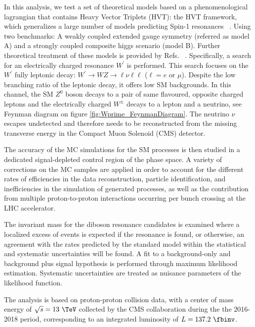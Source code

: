 In this analysis, we test a set of theoretical models based on a phenomenological
lagrangian that contains Heavy Vector Triplets (HVT): the HVT framework, which
generalizes a large number of models predicting Spin-1 resonances ~\cite{hvt2014}.
Using two benchmarks: A weakly coupled extended gauge symmetry (referred as model A) and a
strongly coupled composite higgs scenario (model B). Further theoretical treatment of these models
is provided by Refs. ~\cite{hvt2014,modelA1980,modelB2011}. Specifically, a search
for an electrically charged resonance $W^{\prime}$ is performed. This search focuses
on the $W^{\prime}$ fully leptonic decay:
$W^{\prime}\rightarrow WZ \rightarrow \ell\nu \ell\ell$ ($\ell = e$ or $\mu$).
Despite the low branching ratio of the leptonic decay, it offers low SM backgrounds.
In this channel, the SM $Z^{0}$
boson decays to a pair of same flavoured, opposite charged leptons and the
electrically charged $W^{\pm}$ decays to a lepton and a neutrino, see Feynman diagram
on figure \ref{fig:Wprime_FeynmanDiagram}. The neutrino $\nu$ escapes
undetected and therefore needs to be reconstructed from the missing transverse
energy in the Compact Muon Solenoid (CMS) detector.

The accuracy of the MC simulations for the SM processes is then studied in a
dedicated signal-depleted control region of the phase space. A variety of
corrections on the MC samples are applied in order to account for the different
rates of efficiencies in the data reconstruction, particle identification, and
inefficiencies in the simulation of generated processes, as well as the
contribution from multiple proton-to-proton interactions occurring per bunch
crossing at the LHC accelerator.

The invariant mass for the diboson resonance candidates is
examined where a localized excess of events is expected if the resonance is
found, or otherwise, an agreement with the rates predicted by the standard model
within the statistical and systematic uncertainties will be found.
A fit to a background-only and background plus signal hypothesis is performed
through maximum likelihood estimation. Systematic uncertainties are
treated as nuisance parameters of the likelihood function.

The analysis is based on proton-proton collision data, with a center of mass
energy of $\sqrt{s}=13~\TeV$ collected by the CMS collaboration during the the
2016-2018 period, corresponding to an integrated luminosity of $L=137.2~\fbinv$.
